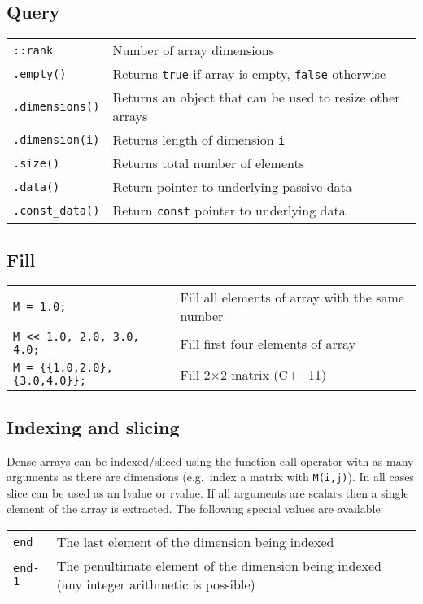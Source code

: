 \documentclass[10pt,a4,landscape]{article}
\def\code#1{\texttt{#1}}
\begin{document}
\subsection*{Query}
\begin{tabular}{ll}
\code{::rank} & Number of array dimensions\\
\code{.empty()} & Returns \code{true} if array is empty, \code{false} otherwise\\
\code{.dimensions()} & Returns an object that can be used to resize other arrays\\
\code{.dimension(i)} & Returns length of dimension \code{i}\\
\code{.size()} & Returns total number of elements\\
\code{.data()} & Return pointer to underlying passive data\\
\code{.const\_data()} & Return \code{const} pointer to underlying data\\
\end{tabular}
\subsection*{Fill}
\begin{tabular}{ll}
\code{M = 1.0;} & Fill all elements of array with the same number\\
\code{M <{}< 1.0, 2.0, 3.0, 4.0;} & Fill first four elements of array\\
\code{M = \{\{1.0,2.0\},\{3.0,4.0\}\};} & Fill 2$\times$2 matrix (C++11)\\
\end{tabular}
\subsection*{Indexing and slicing}
Dense arrays can be indexed/sliced using the function-call operator
with as many arguments as there are dimensions (e.g.\ index a matrix
with \code{M(i,j)}). In all cases slice can be used as an lvalue or
rvalue. If all arguments are scalars then a single element of the
array is extracted. The following special values are available:\\
\begin{tabular}{ll}
\code{end} & The last element of the dimension being indexed\\
\code{end-1} & The penultimate element of the dimension being indexed (any integer arithmetic is possible)\\
\end{tabular}
\end{document}
